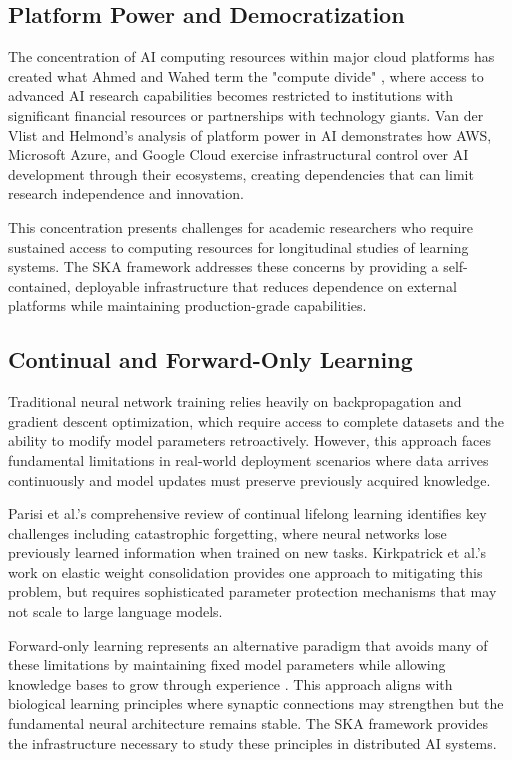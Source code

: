 \documentclass[11pt]{article}
\begin{document}
	\subsection{Platform Power and Democratization}
	The concentration of AI computing resources within major cloud platforms has created what Ahmed and Wahed term the "compute divide" \cite{computedivide2020}, where access to advanced AI research capabilities becomes restricted to institutions with significant financial resources or partnerships with technology giants. Van der Vlist and Helmond's analysis of platform power in AI \cite{platformpower2023} demonstrates how AWS, Microsoft Azure, and Google Cloud exercise infrastructural control over AI development through their ecosystems, creating dependencies that can limit research independence and innovation.
	
	This concentration presents challenges for academic researchers who require sustained access to computing resources for longitudinal studies of learning systems. The SKA framework addresses these concerns by providing a self-contained, deployable infrastructure that reduces dependence on external platforms while maintaining production-grade capabilities.
	
	\subsection{Continual and Forward-Only Learning}
	Traditional neural network training relies heavily on backpropagation and gradient descent optimization, which require access to complete datasets and the ability to modify model parameters retroactively. However, this approach faces fundamental limitations in real-world deployment scenarios where data arrives continuously and model updates must preserve previously acquired knowledge.
	
	Parisi et al.'s comprehensive review of continual lifelong learning \cite{continuallearning2022} identifies key challenges including catastrophic forgetting, where neural networks lose previously learned information when trained on new tasks. Kirkpatrick et al.'s work on elastic weight consolidation \cite{catastrophicforgetting2021} provides one approach to mitigating this problem, but requires sophisticated parameter protection mechanisms that may not scale to large language models.
	
	Forward-only learning represents an alternative paradigm that avoids many of these limitations by maintaining fixed model parameters while allowing knowledge bases to grow through experience \cite{forwardonly2023}. This approach aligns with biological learning principles where synaptic connections may strengthen but the fundamental neural architecture remains stable. The SKA framework provides the infrastructure necessary to study these principles in distributed AI systems.
	
\end{document}
